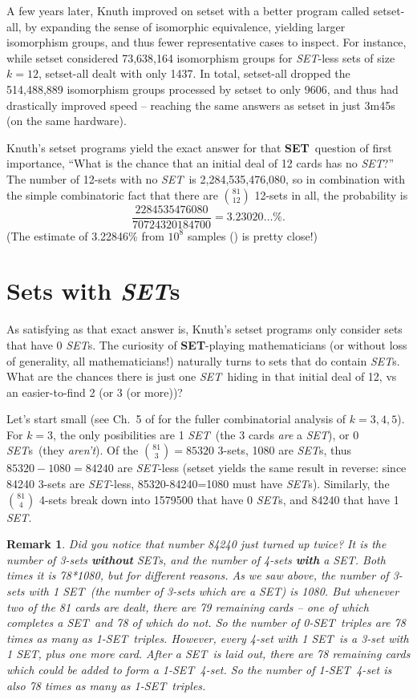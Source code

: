 \documentclass{article}
\newtheorem*{remark}{Remark}
\newcommand{\SET}{{\em SET}}
\newcommand{\SETs}{{\em SET}s}
\newcommand{\SETg}{{\bf SET}}
\newcommand{\SETSETb}{{\sc setset }}
\newcommand{\SETSETA}{{\sc setset-all}}
\newcommand{\SETSETAb}{{\sc setset-all }}
\begin{document}
A few years later, Knuth improved on \SETSETb with a better program called
\SETSETA, by expanding the sense of isomorphic equivalence, yielding larger
isomorphism groups, and thus fewer representative cases to inspect. For
instance, while \SETSETb considered 73,638,164 isomorphism groups for \SET-less
sets of size $k=12$, \SETSETAb dealt with only 1437. In total, \SETSETAb dropped
the 514,488,889 isomorphism groups processed by \SETSETb to only 9606, and thus
had drastically improved speed -- reaching the same answers as \SETSETb in just
3m45s (on the same hardware).

Knuth's \SETSETb programs yield the exact answer for that \SETg~question of first
importance, ``What is the chance that an initial deal of 12 cards has no \SET?''
The number of 12-sets with no \SET~is 2,284,535,476,080, so in combination with
the simple combinatoric fact that there are $\binom{81}{12}$ 12-sets in all, the
probability is
$$\frac{2284535476080}{70724320184700} = 3.23020\ldots\%.$$
(The estimate of 3.22846\% from $10^8$ samples (\cite{JOS}) is pretty close!)

\section{Sets with \SETs}
As satisfying as that exact answer is, Knuth's \SETSETb programs only consider
sets that have 0 \SETs. The curiosity of \SETg-playing mathematicians (or without
loss of generality, all mathematicians!) naturally turns to sets that do contain
\SETs. What are the chances there is just one \SET~hiding in that initial deal
of 12, vs an easier-to-find 2 (or 3 (or more))?

Let's start small (see Ch.~5 of \cite{JOS} for the fuller combinatorial analysis
of $k=3,4,5$). For $k=3$, the only posibilities are 1 \SET~(the 3 cards {\em
  are} a \SET), or 0 \SETs~(they {\em aren't}). Of the $\binom{81}{3}=85320$
3-sets, 1080 are \SETs, thus $85320-1080=84240$ are \SET-less (\SETSETb yields
the same result in reverse: since 84240 3-sets are \SET-less, 85320-84240=1080
must have \SETs). Similarly, the $\binom{81}{4}$ 4-sets break down into 1579500
that have 0 \SETs, and 84240 that have 1 \SET.
\begin{remark}Did you notice that number 84240 just turned up twice? It is the
number of 3-sets {\bf without} SETs, and the number of 4-sets {\bf with} a
SET. Both times it is 78*1080, but for different reasons. As we saw above, the
number of 3-sets with 1 SET~(the number of 3-sets which {\em are} a SET) is
1080. But whenever two of the 81 cards are dealt, there are 79 remaining cards
-- one of which completes a SET~and 78 of which do not. So the number of
0-SET~triples are 78 times as many as 1-SET~triples. However, every 4-set with
1 SET~is a 3-set with 1 SET, plus one more card. After a SET~is laid out,
there are 78 remaining cards which could be added to form a 1-SET~4-set. So
the number of 1-SET~4-set is also 78 times as many as 1-SET~triples.
\end{remark}
\end{document}
